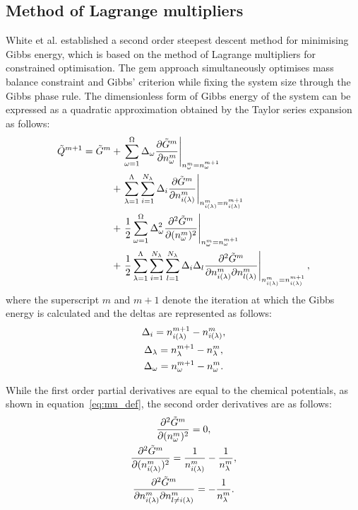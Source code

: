 \subsection{Method of Lagrange multipliers}
White et al. \cite{White:58} established a second order steepest descent method for minimising Gibbs energy, which is based on the method of Lagrange multipliers for constrained optimisation. The \gls{gem} approach simultaneously optimises mass balance constraint and Gibbs' criterion while fixing the system size through the Gibbs phase rule. The dimensionless form of Gibbs energy of the system can be expressed as a quadratic approximation obtained by the Taylor series expansion as follows:
  \begin{equation}\label{eq:GibbsTaylor}
    \begin{split}
      \tilde{Q}^{m+1} = \tilde{G}^{m} &+ \left .\sumstoichphase \Delta_{\omega} \pder{\tilde{G}^m}{\molestoich^m} \right \vert_{\molestoich^m = \molestoich^{m+1}} \\
                      &+ \left . \sumsolnphase \sumspecies \Delta_i \pder{\tilde{G}^m}{\molespecies{i}^m}\right \vert_{\molespecies{i}^m = \molespecies{i}^{m+1}} \\
                      &+ \left . \frac{1}{2} \sumstoichphase \Delta^2_{\omega} \ppder{\tilde{G}^m}{\molestoich^m} \right \vert_{\molestoich^m = \molestoich^{m+1}} \\
                      &+ \left . \frac{1}{2} \sumsolnphase \sumspecies \sumspecies[l] \Delta_i \Delta_l \pqder{\tilde{G}^m}{\molespecies{i}^m}{\molespecies{l}^m} \right \vert_{\molespecies{i}^m = \molespecies{i}^{m+1}},
    \end{split}
  \end{equation}
where the superscript $m$ and $m+1$ denote the iteration at which the Gibbs energy is calculated and the deltas are represented as follows:
  \begin{gather}
      \Delta_i = \molespecies{i}^{m+1} - \molespecies{i}^{m},\\
      \Delta_\lambda = \molesol^{m+1} - \molesol^{m}, \\
      \Delta_\omega = \molestoich^{m+1} - \molestoich^{m}.
  \end{gather}

While the first order partial derivatives are equal to the chemical potentials, as shown in equation~\eqref{eq:mu_def}, the second order derivatives are as follows:
\begin{gather}
  \ppder{\tilde{G}^m}{\molestoich^m} = 0, \label{eq:partial1}\\
  \ppder{\tilde{G}^m}{\molespecies{i}^m} = \frac{1}{\molespecies{i}^m} - \frac{1}{\molesol^m}, \label{eq:partial2} \\
  \pqder{\tilde{G}^m}{\molespecies{i}^m}{\molespecies{l \neq i}^m} = - \frac{1}{\molesol^m}. \label{eq:partial3}
\end{gather}

